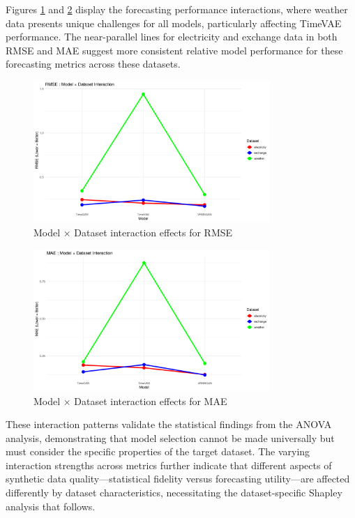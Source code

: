 \documentclass{article}
\begin{document}
Figures \ref{fig:rmse_interaction} and \ref{fig:mae_interaction} display the forecasting performance interactions, where weather data presents unique challenges for all models, particularly affecting TimeVAE performance. The near-parallel lines for electricity and exchange data in both RMSE and MAE suggest more consistent relative model performance for these forecasting metrics across these datasets.

\begin{figure}[H]
\centering
\includegraphics[width=0.8\textwidth]{assets/interaction_rmse.png}
\caption{Model × Dataset interaction effects for RMSE}
\label{fig:rmse_interaction}
\end{figure}

\begin{figure}[H]
\centering
\includegraphics[width=0.8\textwidth]{assets/interaction_mae.png}
\caption{Model × Dataset interaction effects for MAE}
\label{fig:mae_interaction}
\end{figure}

These interaction patterns validate the statistical findings from the ANOVA analysis, demonstrating that model selection cannot be made universally but must consider the specific properties of the target dataset. The varying interaction strengths across metrics further indicate that different aspects of synthetic data quality—statistical fidelity versus forecasting utility—are affected differently by dataset characteristics, necessitating the dataset-specific Shapley analysis that follows.
\end{document}
